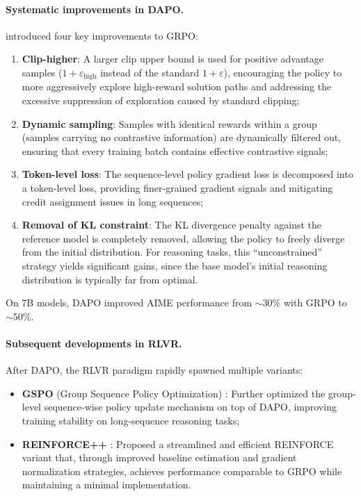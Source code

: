\paragraph{Systematic improvements in DAPO.}
 introduced four key improvements to GRPO:
\begin{enumerate}[leftmargin=2em]
  \item \textbf{Clip-higher}: A larger clip upper bound is used for positive advantage samples
    ($1 + \varepsilon_{\text{high}}$ instead of the standard $1 + \varepsilon$),
    encouraging the policy to more aggressively explore high-reward solution paths
    and addressing the excessive suppression of exploration caused by standard clipping;
  \item \textbf{Dynamic sampling}:
    Samples with identical rewards within a group (samples carrying no contrastive information) are dynamically filtered out,
    ensuring that every training batch contains effective contrastive signals;
  \item \textbf{Token-level loss}:
    The sequence-level policy gradient loss is decomposed into a token-level loss,
    providing finer-grained gradient signals and mitigating credit assignment issues in long sequences;
  \item \textbf{Removal of KL constraint}:
    The KL divergence penalty against the reference model is completely removed,
    allowing the policy to freely diverge from the initial distribution.
    For reasoning tasks, this ``unconstrained'' strategy yields significant gains,
    since the base model's initial reasoning distribution is typically far from optimal.
\end{enumerate}
On 7B models, DAPO improved AIME performance from $\sim$30\% with GRPO to $\sim$50\%.

\paragraph{Subsequent developments in RLVR.}
After DAPO, the RLVR paradigm rapidly spawned multiple variants:
\begin{itemize}[leftmargin=2em]
  \item \textbf{GSPO} (Group Sequence Policy Optimization) \cite{zheng2025gspo}:
    Further optimized the group-level sequence-wise policy update mechanism on top of DAPO,
    improving training stability on long-sequence reasoning tasks;
  \item \textbf{REINFORCE++} \cite{hu2025reinforcepp}:
    Proposed a streamlined and efficient REINFORCE variant that,
    through improved baseline estimation and gradient normalization strategies,
    achieves performance comparable to GRPO while maintaining a minimal implementation.
\end{itemize}

